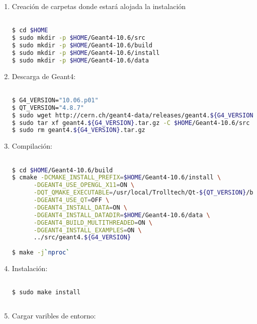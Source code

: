 \begin{enumerate}
    \item Creación de carpetas donde estará alojada la instalación
    
\begin{lstlisting}[language=bash,style=mystyle]

$ cd $HOME
$ sudo mkdir -p $HOME/Geant4-10.6/src 
$ sudo mkdir -p $HOME/Geant4-10.6/build 
$ sudo mkdir -p $HOME/Geant4-10.6/install 
$ sudo mkdir -p $HOME/Geant4-10.6/data 

\end{lstlisting}
    
    \item Descarga de Geant4:
    
\begin{lstlisting}[language=bash,style=mystyle]

$ G4_VERSION="10.06.p01"
$ QT_VERSION="4.8.7"
$ sudo wget http://cern.ch/geant4-data/releases/geant4.${G4_VERSION}.tar.gz
$ sudo tar xf geant4.${G4_VERSION}.tar.gz -C $HOME/Geant4-10.6/src
$ sudo rm geant4.${G4_VERSION}.tar.gz 

\end{lstlisting}     


    \item Compilación:
    
\begin{lstlisting}[language=bash,style=mystyle]

$ cd $HOME/Geant4-10.6/build
$ cmake -DCMAKE_INSTALL_PREFIX=$HOME/Geant4-10.6/install \
      -DGEANT4_USE_OPENGL_X11=ON \
      -DQT_QMAKE_EXECUTABLE=/usr/local/Trolltech/Qt-${QT_VERSION}/bin/qmake \
      -DGEANT4_USE_QT=OFF \
      -DGEANT4_INSTALL_DATA=ON \
      -DGEANT4_INSTALL_DATADIR=$HOME/Geant4-10.6/data \
      -DGEANT4_BUILD_MULTITHREADED=ON \
      -DGEANT4_INSTALL_EXAMPLES=ON \
      ../src/geant4.${G4_VERSION}
      
$ make -j`nproc` 

\end{lstlisting}     

    
    \item Instalación:

\begin{lstlisting}[language=bash,style=mystyle]

$ sudo make install
 
\end{lstlisting}     

    \item Cargar varibles de entorno:


\end{enumerate}
